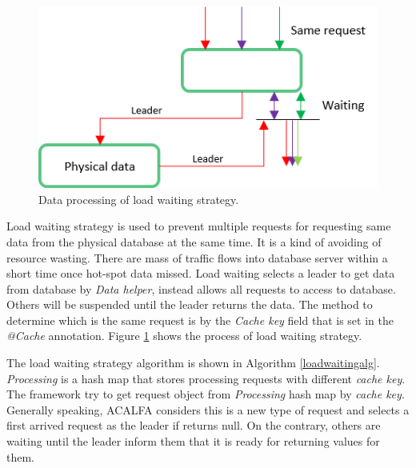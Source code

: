 \documentclass{singlecol-new}
\theoremstyle{TH}{
\newtheorem{lemma}{Lemma}
\newtheorem{theorem}[lemma]{Theorem}
\newtheorem{corrolary}[lemma]{Corrolary}
\newtheorem{conjecture}[lemma]{Conjecture}
\newtheorem{proposition}[lemma]{Proposition}
\newtheorem{claim}[lemma]{Claim}
\newtheorem{stheorem}[lemma]{Wrong Theorem}
}
\theoremstyle{THrm}{
\newtheorem{definition}{Definition}[section]
\newtheorem{question}{Question}[section]
\newtheorem{remark}{Remark}
\newtheorem{scheme}{Scheme}
}
\theoremstyle{THhit}{
\newtheorem{case}{Case}[section]
}
\begin{document}
\begin{figure} [htb]
\centering
\includegraphics[width=0.8\linewidth]{img/loadwaiting}
\caption{\label{loadwaiting}Data processing of load waiting strategy.}
\end{figure}

Load waiting strategy is used to prevent multiple requests for requesting same data from the physical database at the same time. It is a kind of avoiding of resource wasting. There are mass of traffic flows into database server within a short time once hot-spot data missed. Load waiting selects a leader to get data from database by \textit{Data helper}, instead allows all requests to access to database. Others will be suspended until the leader returns the data. The method to determine which is the same request is by the \textit{Cache key} field that is set in the \textit{@Cache} annotation. Figure \ref{loadwaiting} shows the process of load waiting strategy.

The load waiting strategy algorithm is shown in Algorithm \ref{loadwaitingalg}. \textit{Processing} is a hash map that stores processing requests with different \textit{cache key}. The framework try to get request object from \textit{Processing} hash map by \textit{cache key}. Generally speaking, ACALFA considers this is a new type of request and selects a first arrived request as the leader if returns null. On the contrary, others are waiting until the leader inform them that it is ready for returning values for them.
\end{document}
